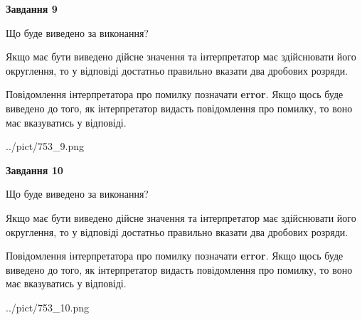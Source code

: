 \documentclass[12pt, ukrainian]{article}
\begin{document}
{\begin {Large}
{\begin {center}\textbf{Завдання 9}\end {center}}\par
Що буде виведено за виконання? \par

Якщо має бути виведено дійсне значення та інтерпретатор має здійснювати його округлення, 
то у відповіді достатньо правильно вказати два дробових розряди.

Повідомлення інтерпретатора про помилку позначати \textbf{error}.
Якщо щось буде виведено до того, як інтерпретатор видасть повідомлення про помилку, 
то воно має вказуватись у відповіді. \par

\begin{center}
	{../pict/753_9.png}
\end{center}
\newpage

{\begin {center}\textbf{Завдання 10}\end {center}}\par
Що буде виведено за виконання? \par

Якщо має бути виведено дійсне значення та інтерпретатор має здійснювати його округлення, 
то у відповіді достатньо правильно вказати два дробових розряди.

Повідомлення інтерпретатора про помилку позначати \textbf{error}.
Якщо щось буде виведено до того, як інтерпретатор видасть повідомлення про помилку, 
то воно має вказуватись у відповіді. \par

\begin{center}
	{../pict/753_10.png}
\end{center}
\newpage

\end {Large}}
\end{document}
